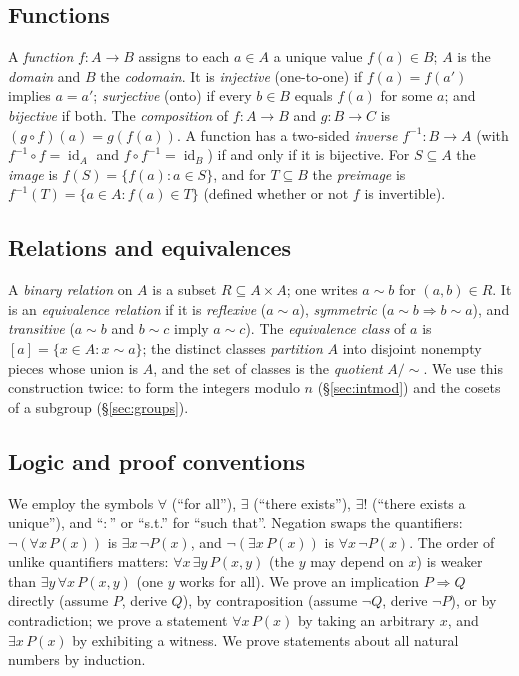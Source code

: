 \documentclass[11pt,a4paper]{article}
\theoremstyle{definition}
\theoremstyle{remark}
\DeclareMathOperator{\id}{id}
\begin{document}
\subsection{Functions}\label{sets:subsec:functions}
A \emph{function} \(f \colon A \to B\) assigns to each \(a \in A\) a unique value
\(f(a) \in B\); \(A\) is the \emph{domain} and \(B\) the \emph{codomain}. It is
\emph{injective} (one-to-one) if \(f(a) = f(a')\) implies \(a = a'\);
\emph{surjective} (onto) if every \(b \in B\) equals \(f(a)\) for some \(a\); and
\emph{bijective} if both. The \emph{composition} of \(f \colon A \to B\) and
\(g \colon B \to C\) is \((g \circ f)(a) = g(f(a))\). A function has a two-sided
\emph{inverse} \(f^{-1} \colon B \to A\) (with \(f^{-1}\circ f = \id_A\) and
\(f \circ f^{-1} = \id_B\)) if and only if it is bijective. For \(S \subseteq A\)
the \emph{image} is \(f(S) = \{f(a) : a \in S\}\), and for \(T \subseteq B\) the
\emph{preimage} is \(f^{-1}(T) = \{a \in A : f(a) \in T\}\) (defined whether or
not \(f\) is invertible).

\subsection{Relations and equivalences}\label{sets:subsec:relations}
A \emph{binary relation} on \(A\) is a subset \(R \subseteq A \times A\); one writes
\(a \sim b\) for \((a,b) \in R\). It is an \emph{equivalence relation} if it is
\emph{reflexive} (\(a \sim a\)), \emph{symmetric} (\(a \sim b \Rightarrow b \sim
a\)), and \emph{transitive} (\(a \sim b\) and \(b \sim c\) imply \(a \sim c\)).
The \emph{equivalence class} of \(a\) is \([a] = \{x \in A : x \sim a\}\); the
distinct classes \emph{partition} \(A\) into disjoint nonempty pieces whose union
is \(A\), and the set of classes is the \emph{quotient} \(A/{\sim}\). We use this
construction twice: to form the integers modulo \(n\) (\S\ref{sec:intmod}) and the cosets of a
subgroup (\S\ref{sec:groups}).

\subsection{Logic and proof conventions}\label{sets:subsec:logic}
We employ the symbols \(\forall\) (``for all''), \(\exists\) (``there exists''), \(\exists!\)
(``there exists a unique''), and ``\(\colon\)'' or ``s.t.'' for ``such that''.
Negation swaps the quantifiers: \(\neg(\forall x\, P(x))\) is \(\exists x\,\neg
P(x)\), and \(\neg(\exists x\, P(x))\) is \(\forall x\,\neg P(x)\). The order of
unlike quantifiers matters: \(\forall x\,\exists y\,P(x,y)\) (the \(y\) may depend
on \(x\)) is weaker than \(\exists y\,\forall x\,P(x,y)\) (one \(y\) works for
all). We prove an implication \(P \Rightarrow Q\) directly (assume \(P\), derive \(Q\)), by
contraposition (assume \(\neg Q\), derive \(\neg P\)), or by contradiction; we prove a statement
\(\forall x\,P(x)\) by taking an arbitrary \(x\), and \(\exists x\,P(x)\) by
exhibiting a witness. We prove statements about all natural numbers by
induction.
\end{document}
